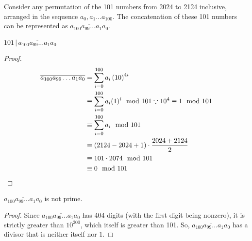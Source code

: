 \documentclass[10pt]{../usamts}
\begin{document}
\begin{solution}

Consider any permutation of the 101 numbers from 2024 to 2124 inclusive, arranged in the sequence $a_0, a_1 \dots a_{100}$. The concatenation of these 101 numbers can be represented as $\overline{a_{100} a_{99} \dots a_{1} a_{0}}$.

\begin{claim}
    $101\,|\,\overline{a_{100} a_{99} \dots a_{1} a_{0}}$
\end{claim}
\begin{proof}
    
    \begin{align*}
    \overline{a_{100} a_{99} \dots a_{1} a_{0}}
        &= \sum_{i=0}^{100} a_i \left( 10 \right)^{4i} \\
        &\equiv \sum_{i=0}^{100} a_i (1)^i \mod 101 \because 10^4 \equiv 1 \mod 101\\
        &\equiv \sum_{i=0}^{100} a_i \mod 101 \\
        &\equiv (2124 - 2024 + 1) \cdot \frac{2024 + 2124}{2} \\
        &\equiv 101 \cdot 2074 \mod 101 \\
        &\equiv 0 \mod 101
    \end{align*}
\end{proof}
\begin{claim}
    $\overline{a_{100} a_{99} \dots a_{1} a_{0}}$ is not prime.
\end{claim}
\begin{proof}
    Since $\overline{a_{100} a_{99} \dots a_{1} a_{0}}$ has 404 digits (with the first digit being nonzero), it is strictly greater than $10^{200}$, which itself is greater than 101. So, $\overline{a_{100} a_{99} \dots a_{1} a_{0}}$ has a divisor that is neither itself nor 1.
\end{proof}

\end{solution}
\end{document}
